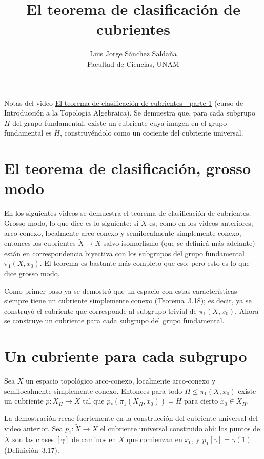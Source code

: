 \documentclass[11pt]{article}
\title{El teorema de clasificación de cubrientes}
\author{Luis Jorge Sánchez Saldaña\\[2pt]\small Facultad de Ciencias, UNAM}
\date{}
\begin{document}
\maketitle

\noindent\small Notas del video
\href{https://www.youtube.com/watch?v=Z7lLeqbTcZM}{\guillemotleft{}El teorema de clasificación de cubrientes - parte 1\guillemotright{}}
(curso de Introducción a la Topología Algebraica). Se demuestra que, para cada subgrupo $H$ del grupo fundamental, existe un cubriente cuya imagen en el grupo fundamental es $H$, construyéndolo como un cociente del cubriente universal.
\normalsize

\section*{El teorema de clasificación, grosso modo}

En los siguientes videos se demuestra el teorema de clasificación de cubrientes. Grosso modo, lo que dice es lo siguiente: si $X$ es, como en los videos anteriores, arco-conexo, localmente arco-conexo y semilocalmente simplemente conexo, entonces los cubrientes $\tilde X\to X$ salvo isomorfismo (que se definirá más adelante) están en correspondencia biyectiva con los subgrupos del grupo fundamental $\pi_1(X,x_0)$. El teorema es bastante más completo que eso, pero esto es lo que dice grosso modo.

Como primer paso ya se demostró que un espacio con estas características siempre tiene un cubriente simplemente conexo (Teorema~3.18); es decir, ya se construyó el cubriente que corresponde al subgrupo trivial de $\pi_1(X,x_0)$. Ahora se construye un cubriente para cada subgrupo del grupo fundamental.

\section*{Un cubriente para cada subgrupo}

\begin{prop}\label{prop:XH}
Sea $X$ un espacio topológico arco-conexo, localmente arco-conexo y semilocalmente simplemente conexo. Entonces para todo $H\le\pi_1(X,x_0)$ existe un cubriente $p\colon X_H\to X$ tal que $p_*(\pi_1(X_H,\tilde x_0))=H$ para cierto $\tilde x_0\in X_H$.
\end{prop}

La demostración recae fuertemente en la construcción del cubriente universal del video anterior. Sea $p_1\colon\tilde X\to X$ el cubriente universal construido ahí: los puntos de $\tilde X$ son las clases $[\gamma]$ de caminos en $X$ que comienzan en $x_0$, y $p_1[\gamma]=\gamma(1)$ (Definición~3.17).
\end{document}

